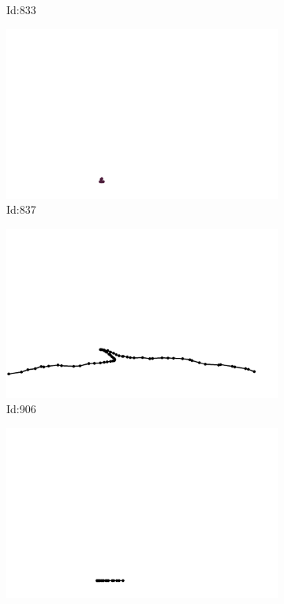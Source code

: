 \documentclass[12pt,twoside]{report}
\begin{document}
\begin{figure}
\begin{subfigure}[b]{0.20\textwidth}
\caption{Id:833}
\end{subfigure}
\begin{subfigure}[b]{0.20\textwidth}
\centering
\includegraphics[width=\textwidth]{../trajectories/837.png}
\caption{Id:837}
\end{subfigure}
\begin{subfigure}[b]{0.20\textwidth}
\centering
\includegraphics[width=\textwidth]{../trajectories/906.png}
\caption{Id:906}
\end{subfigure}
\begin{subfigure}[b]{0.20\textwidth}
\centering
\includegraphics[width=\textwidth]{../trajectories/955.png}

\end{subfigure}
\end{figure}
\end{document}
